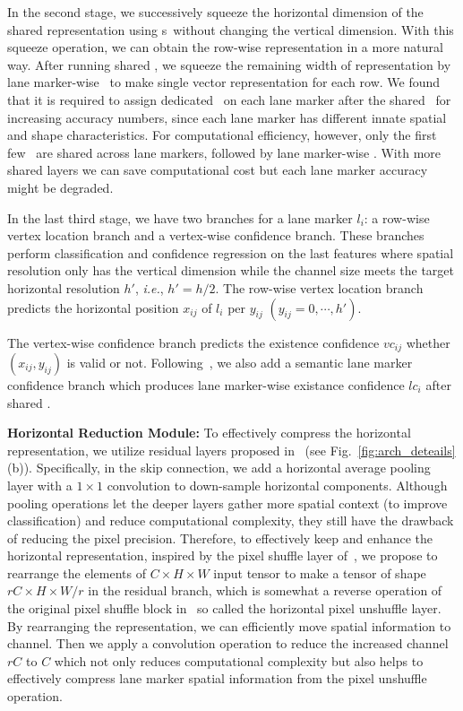 \documentclass[10pt,twocolumn,letterpaper]{article}
\begin{document}
In the second stage, we successively squeeze the horizontal dimension of the shared representation using \reductionname s\ without changing the vertical dimension. With this squeeze operation, we can obtain the row-wise representation in a more natural way. After running shared \reductionnames, we squeeze the remaining width of representation by lane marker-wise \reductionnames\ to make single vector representation for each row. We found that it is required to assign dedicated \reductionnames\ on each lane marker after the shared \reductionnames\ for increasing accuracy numbers, since each lane marker has different innate spatial and shape characteristics. For computational efficiency, however, only the first few \reductionnames\ are shared across lane markers, followed by lane marker-wise \reductionnames. With more shared layers we can save computational cost but each lane marker accuracy might be degraded. 

In the last third stage, we have two branches for a lane marker $l_i$: a row-wise vertex location branch and a vertex-wise confidence branch. These branches perform classification and confidence regression on the last \reductionnames features where spatial resolution only has the vertical dimension while the channel size meets the target horizontal resolution $h'$, \textit{i.e.}, $h'=h/2$. The row-wise vertex location branch predicts the horizontal position $x_{ij}$ of $l_i$ per $y_{ij}$ $(y_{ij} = 0, \cdots, h')$.

The vertex-wise confidence branch predicts the existence confidence $vc_{ij}$ whether $(x_{ij}, y_{ij})$ is valid or not. Following~\cite{SpatialAsDeep}, we also add a semantic lane marker confidence branch which produces lane marker-wise existance confidence $lc_i$ after shared \reductionnames.


\textbf{Horizontal Reduction Module:} To effectively compress the horizontal representation, we utilize residual layers proposed in~\cite{Residual} (see Fig.~\ref{fig:arch_deteails}(b)). Specifically, in the skip connection, we add a horizontal average pooling layer with a $1\times1$ convolution to down-sample horizontal components. Although pooling operations let the deeper layers gather more spatial context (to improve classification) and reduce computational complexity, they still have the drawback of reducing the pixel precision. Therefore, to effectively keep and enhance the horizontal representation, inspired by the pixel shuffle layer of~\cite{Shuffle, shuffle2}, we propose to rearrange the elements of $C\times H \times W$ input tensor to make a tensor of shape $rC \times H \times W/r$ in the residual branch, which is somewhat a reverse operation of the original pixel shuffle block in~\cite{Shuffle} so called the horizontal pixel unshuffle layer. By rearranging the representation, we can efficiently move spatial information to channel. Then we apply a convolution operation to reduce the increased channel $rC$ to $C$ which not only reduces computational complexity but also helps to effectively compress lane marker spatial information from the pixel unshuffle operation.
\end{document}
